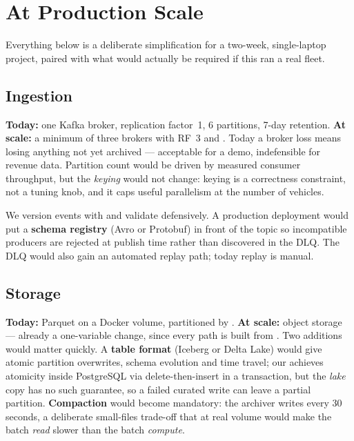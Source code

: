 \section{At Production Scale}
\label{sec:production}

Everything below is a deliberate simplification for a two-week,
single-laptop project, paired with what would actually be required if
this ran a real fleet.

\subsection{Ingestion}

\textbf{Today:} one Kafka broker, replication factor~1, 6 partitions,
7-day retention. \textbf{At scale:} a minimum of three brokers with RF~3
and . Today a broker loss means losing
anything not yet archived --- acceptable for a demo, indefensible for
revenue data. Partition count would be driven by measured consumer
throughput, but the \emph{keying} would not change: 
keying is a correctness constraint, not a tuning knob, and it caps useful
parallelism at the number of vehicles.

We version events with  and validate defensively. A
production deployment would put a \textbf{schema registry} (Avro or
Protobuf) in front of the topic so incompatible producers are rejected at
publish time rather than discovered in the DLQ. The DLQ would also gain
an automated replay path; today replay is manual.

\subsection{Storage}

\textbf{Today:} Parquet on a Docker volume, partitioned by
. \textbf{At scale:} object storage --- already a
one-variable change, since every path is built from .
Two additions would matter quickly. A \textbf{table format} (Iceberg or
Delta Lake) would give atomic partition overwrites, schema evolution and
time travel; our  achieves atomicity inside
PostgreSQL via delete-then-insert in a transaction, but the \emph{lake}
copy has no such guarantee, so a failed curated write can leave a partial
partition. \textbf{Compaction} would become mandatory: the archiver
writes every 30 seconds, a deliberate small-files trade-off that at real
volume would make the batch \emph{read} slower than the batch
\emph{compute}.

